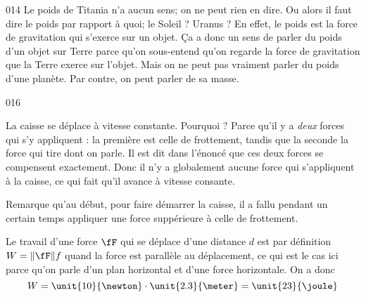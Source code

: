 \documentclass{article}
\begin{document}
\begin{corrige}{014}
Le poids de Titania n'a aucun sens; on ne peut rien en dire. Ou alors il faut dire le poids par rapport à quoi; le Soleil ? Uranus ? En effet, le poids est la force de gravitation qui s'exerce sur un objet. Ça a donc un sens de parler du poids d'un objet sur Terre parce qu'on sous-entend qu'on regarde la force de gravitation que la Terre exerce sur l'objet. Mais on ne peut pas vraiment parler du poids d'une planète. Par contre, on peut parler de sa masse.
\end{corrige}


\begin{corrige}{016}

La caisse se déplace à vitesse constante. Pourquoi ? Parce qu'il y a \emph{deux} forces qui s'y appliquent : la première est celle de frottement, tandis que la seconde la force qui tire dont on parle. Il est dit dans l'énoncé que ces deux forces se compensent exactement. Donc il n'y a globalement aucune force qui s'appliquent à la caisse, ce qui fait qu'il avance à vitesse consante.

Remarque qu'au début, pour faire démarrer la caisse, il a fallu pendant un certain temps appliquer une force suppérieure à celle de frottement.

Le travail d'une force $\fF$ qui se déplace d'une distance $d$ est par définition $W=\| \fF \|f$ quand la force est parallèle au déplacement, ce qui est le cas ici parce qu'on parle d'un plan horizontal et d'une force horizontale. On a donc
\[ 
  W=\unit{10}{\newton}\cdot\unit{2.3}{\meter}=\unit{23}{\joule}
\]



\end{corrige}
\end{document}
